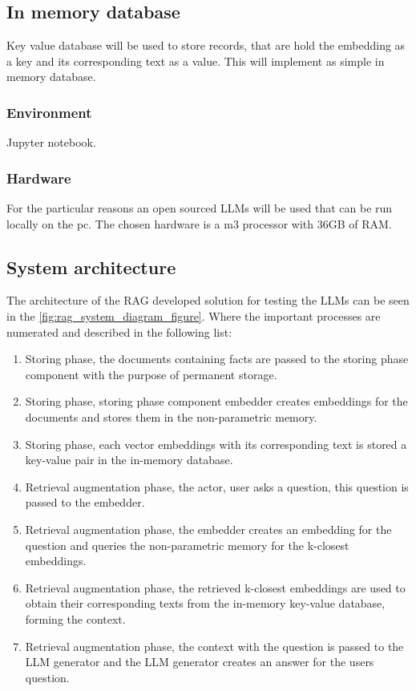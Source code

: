 \documentclass{wseas}
\begin{document}
\subsection{In memory database}
Key value database will be used to store records, that are hold the embedding as a key
and its corresponding text as a value. This will implement as simple in memory database.
\subsubsection{Environment}

Jupyter notebook.

\subsubsection{Hardware}

For the particular reasons an open sourced LLMs will be used that can be
run locally on the pc. The chosen hardware is a m3 processor with 36GB
of RAM.

\subsection{System architecture}
The architecture of the RAG developed solution for testing the LLMs can be seen in the \autoref{fig:rag_system_diagram_figure}. 
Where the important processes are numerated and described in the following list: 

\begin{enumerate}
  \item Storing phase, the documents containing facts are passed to the storing phase component with the purpose of permanent storage.
  \item Storing phase, storing phase component embedder creates embeddings for the documents and stores them in the non-parametric memory.
  \item Storing phase, each vector embeddings with its corresponding text is stored a key-value pair in the in-memory database.
  \item Retrieval augmentation phase, the actor, user asks a question, this question is passed to the embedder.
  \item Retrieval augmentation phase, the embedder creates an embedding for the question and queries the non-parametric memory for the k-closest embeddings.
  \item Retrieval augmentation phase, the retrieved k-closest embeddings are used to obtain their corresponding texts from the in-memory key-value database, forming the context.
  \item Retrieval augmentation phase, the context with the question is passed to the LLM generator and the LLM generator creates an answer for the users question.
\end{enumerate}
\end{document}
